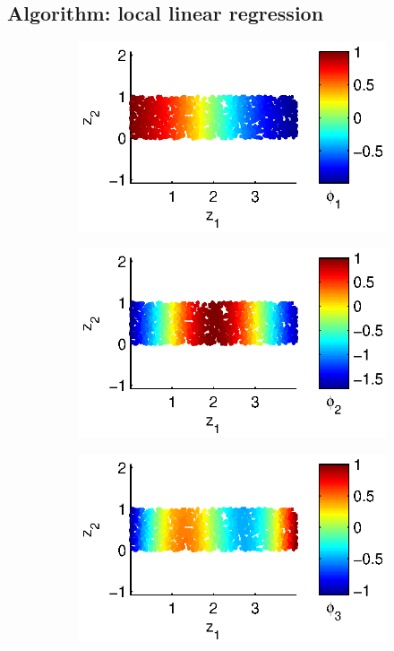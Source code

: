 \subsection{Algorithm: local linear regression}

\begin{figure}[t]
\centering
\begin{subfigure}{0.24\textwidth}
\includegraphics[width=\textwidth]{strip_discrete1}
\end{subfigure}
%
\begin{subfigure}{0.24\textwidth}
\includegraphics[width=\textwidth]{strip_discrete2}
\end{subfigure}
%
\begin{subfigure}{0.24\textwidth}
\includegraphics[width=\textwidth]{strip_discrete3}

\end{subfigure}
\end{figure}
